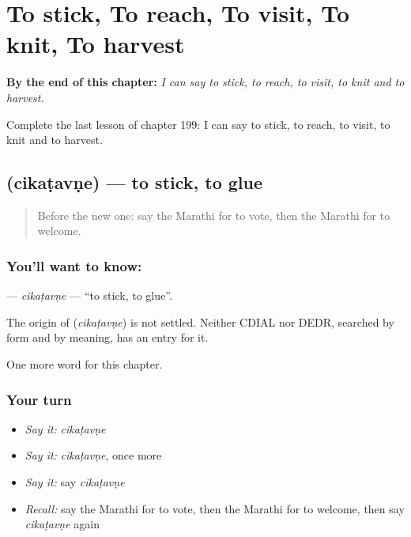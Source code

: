 
\chapter{To stick, To reach, To visit, To knit, To harvest}
\label{ch:mr-to-stick-to-reach-to-visit-to-knit-to-harvest}

\begin{chapteropening}
\textbf{By the end of this chapter:} \emph{I can say to stick, to reach, to visit, to knit and to harvest.}

Complete the last lesson of chapter 199: I can say to stick, to reach, to visit, to knit and to harvest.
\end{chapteropening}

\section[\texorpdfstring{\mr{चिकटवणे} (cikaṭavṇe)}{चिकटवणे (cikaṭavṇe)}]{ (cikaṭavṇe) — to stick, to glue}

\label{lesson:MR-C199-cikatavne}



\begin{quote}
Before the new one: say the Marathi for to vote, then the Marathi for to welcome.
\end{quote}

\subsection*{You'll want to know: }
\textbf{} — \emph{cikaṭavṇe} — \textquotedblleft{}to stick, to glue\textquotedblright{}.

\begin{cousinweb}
The origin of \textbf{} (\emph{cikaṭavṇe}) is not settled. Neither CDIAL nor DEDR, searched by form and by meaning, has an entry for it.
\end{cousinweb}

\begin{grammarlens}[title={What you've built}]
One more word for this chapter.
\end{grammarlens}

\subsection*{Your turn}
\begin{itemize}
\raggedright
  \item \emph{Say it:} \emph{cikaṭavṇe}
  \item \emph{Say it:} \emph{cikaṭavṇe}, once more
  \item \emph{Say it:} say \emph{cikaṭavṇe}
  \item \emph{Recall:} say the Marathi for to vote, then the Marathi for to welcome, then say \emph{cikaṭavṇe} again
\end{itemize}

